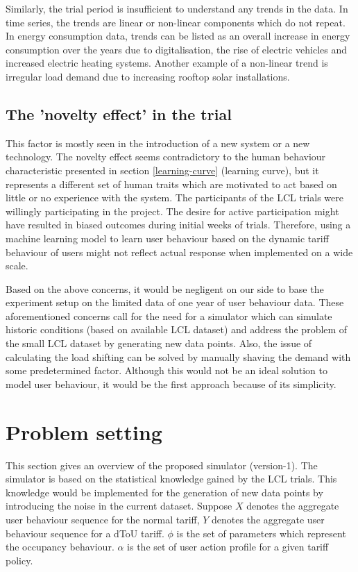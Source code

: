 Similarly, the trial period is insufficient to understand any trends in the data. In time series, the trends are linear or non-linear components which do not repeat. In energy consumption data, trends can be listed as an overall increase in energy consumption over the years due to digitalisation, the rise of electric vehicles and increased electric heating systems. Another example of a non-linear trend is irregular load demand due to increasing rooftop solar installations.

\subsection{The 'novelty effect' in the trial}

This factor is mostly seen in the introduction of a new system or a new technology. The novelty effect seems contradictory to the human behaviour characteristic presented in section \ref{learning-curve} (learning curve), but it represents a different set of human traits which are motivated to act based on little or no experience with the system. The participants of the LCL trials were willingly participating in the project. The desire for active participation might have resulted in biased outcomes during initial weeks of trials. Therefore, using a machine learning model to learn user behaviour based on the dynamic tariff behaviour of users might not reflect actual response when implemented on a wide scale.

Based on the above concerns, it would be negligent on our side to base the experiment setup on the limited data of one year of user behaviour data. These aforementioned concerns call for the need for a simulator which can simulate historic conditions (based on available LCL dataset) and address the problem of the small LCL dataset by generating new data points. Also, the issue of calculating the load shifting can be solved by manually shaving the demand with some predetermined factor. Although this would not be an ideal solution to model user behaviour, it would be the first approach because of its simplicity.



\section{Problem setting}
This section gives an overview of the proposed simulator (version-1). The simulator is based on the statistical knowledge gained by the LCL trials. This knowledge would be implemented for the generation of new data points by introducing the noise in the current dataset. Suppose $X$ denotes the aggregate user behaviour sequence for the normal tariff, $Y$ denotes the aggregate user behaviour sequence for a dToU tariff. $\phi$ is the set of parameters which represent the occupancy behaviour. $\alpha$ is the set of user action profile for a given tariff policy.

